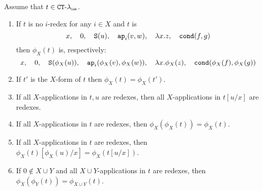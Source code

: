 \begin{lemma}
Assume that $t \in { { {\tt CT} \mbox{-} \lambda} _ {\mbox{\tiny \tt lab}} }$. 
\begin{enumerate}

\item
If $t$ is no $i$-redex for any $i \in X$ and $t$ is
$$ 
x, \ \ \  
0, \ \ \  
{\tt S}(u),  \ \ \  
{\tt ap}_i(v,w), \ \ \  
\lambda x.z, \ \ \  
{\tt cond}(f,g)
$$
then $\phi_X(t)$ is, respectively:
$$ 
x, \ \ \  
0, \ \ \  
{\tt S}(\phi_X(u)),  \ \ \  
{\tt ap}_i(\phi_X(v),\phi_X(w)), \ \ \  
\lambda x.\phi_X(z), \ \ \  
{\tt cond}(\phi_X(f),\phi_X(g))
$$

\item
If $t'$ is the $X$-form of $t$ then $\phi_X(t) = \phi_X(t')$.

\item
If all $X$-applications in $t,u$ are redexes, then all $X$-applications in $t[u/x]$ are redexes.

\item
If all $X$-applications in $t$ are redexes, then $\phi_{X}(\phi_{X}(t)) = \phi_{X}(t)$.

\item
If all $X$-applications in $t$ are redexes, then $\phi_{X}(t)[\phi_{X}(u)/x]= \phi_{X}(t[u/x])$.

\item
If $0 \not \in X \cup Y$ and all $X \cup Y$-applications in $t$ are redexes, 
then $\phi_{X}(\phi_{Y}(t)) = \phi_{X \cup Y}(t)$.

\end{enumerate}
\end{lemma}



